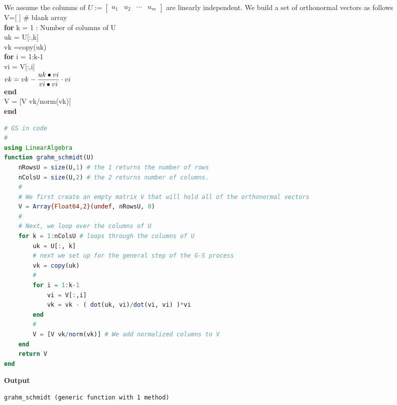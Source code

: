 \begin{tcolorbox}[ title=\textbf{\Large Gram-Schmidt Process as Pseudocode}]

We assume the columns of $U:=\left[ \begin{array}{cccc} u_1 & u_2 & \cdots  & u_m \end{array} \right] $
are linearly independent. We build a set of orthonormal vectors as follows\\
{\rm 
V=[ ] \# blank array\\
\textbf{for} k = 1 : Number of columns of U\\
\hspace*{1cm} uk = U[:,k]\\
\hspace*{1cm} vk =copy(uk)\\
\hspace*{1cm} \textbf{for} i = 1:k-1\\
\hspace*{2cm} vi = V[:,i]\\
\hspace*{2cm} $\mathlarger{vk = vk - \frac{  uk \bullet vi}{vi \bullet vi}  \cdot vi}$\\
\hspace*{1cm} \textbf{end}\\
\hspace*{1cm} V = [V vk/norm(vk)] \\
\textbf{end}
}
\end{tcolorbox}

\begin{lstlisting}[language=Julia,style=mystyle]
# GS in code
# 
using LinearAlgebra
function grahm_schmidt(U)
    nRowsU = size(U,1) # the 1 returns the number of rows
    nColsU = size(U,2) # the 2 returns number of columns. 
    #
    # We first create an empty matrix V that will hold all of the orthonormal vectors
    V = Array{Float64,2}(undef, nRowsU, 0)
    #
    # Next, we loop over the columns of U
    for k = 1:nColsU # loops through the columns of U
        uk = U[:, k] 
        # next we set up for the general step of the G-S process
        vk = copy(uk)
        #
        for i = 1:k-1
            vi = V[:,i]
            vk = vk - ( dot(uk, vi)/dot(vi, vi) )*vi
        end
        #
        V = [V vk/norm(vk)] # We add normalized columns to V
    end
    return V
end
\end{lstlisting}
\textbf{Output} 
\begin{verbatim}
grahm_schmidt (generic function with 1 method)
\end{verbatim}

